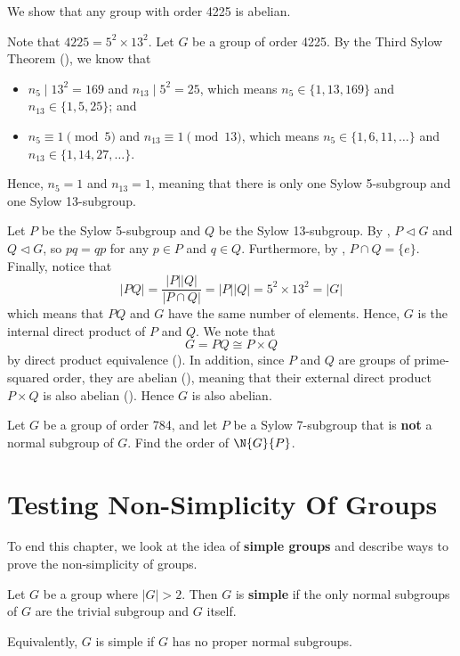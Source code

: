 \begin{example}
    We show that any group with order 4225 is abelian.

    Note that $4225 = 5^2 \times 13^2$. Let $G$ be a group of order 4225. By the Third Sylow Theorem (), we know that
    \begin{itemize}
        \item $n_5 \mid 13^2 = 169$ and $n_{13} \mid 5^2 = 25$, which means $n_5 \in \{1, 13, 169\}$ and $n_{13} \in \{1, 5, 25\}$; and
        \item $n_5 \equiv 1 \pmod 5$ and $n_{13} \equiv 1 \pmod{13}$, which means $n_5 \in \{1, 6, 11, \dots\}$ and $n_{13} \in \{1, 14, 27, \dots\}$.
    \end{itemize}
    Hence, $n_5 = 1$ and $n_{13} = 1$, meaning that there is only one Sylow 5-subgroup and one Sylow 13-subgroup.

    Let $P$ be the Sylow 5-subgroup and $Q$ be the Sylow 13-subgroup. By , $P \lhd G$ and $Q \lhd G$, so $pq = qp$ for any $p \in P$ and $q \in Q$. Furthermore, by , $P \cap Q = \{e\}$. Finally, notice that
    \[
        |PQ| = \frac{|P||Q|}{|P\cap Q|} = |P||Q| = 5^2\times13^2 = |G|
    \]
    which means that $PQ$ and $G$ have the same number of elements. Hence, $G$ is the internal direct product of $P$ and $Q$. We note that
    \[
        G = PQ \cong P\times Q
    \]
    by direct product equivalence (). In addition, since $P$ and $Q$ are groups of prime-squared order, they are abelian (), meaning that their external direct product $P\times Q$ is also abelian (). Hence $G$ is also abelian.
\end{example}

\begin{exercise}
    Let $G$ be a group of order 784, and let $P$ be a Sylow 7-subgroup that is \textbf{not} a normal subgroup of $G$. Find the order of $\N{G}{P}$.
\end{exercise}

\section{Testing Non-Simplicity Of Groups}
To end this chapter, we look at the idea of \textbf{simple groups} and describe ways to prove the non-simplicity of groups.
\begin{definition}
    Let $G$ be a group where $|G| > 2$. Then $G$ is \textbf{simple} if the only normal subgroups of $G$ are the trivial subgroup and $G$ itself.
\end{definition}
\begin{remark}
    Equivalently, $G$ is simple if $G$ has no proper normal subgroups.
\end{remark}

